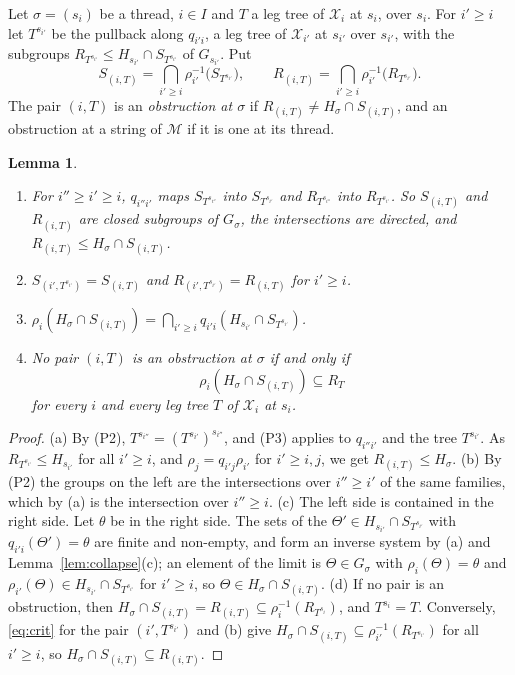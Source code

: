 \documentclass[11pt]{amsart}
\newtheorem{lem}[thm]{Lemma}
\theoremstyle{definition}
\newcommand{\cX}{\mathcal X}
\newcommand{\cM}{\mathcal M}
\begin{document}
Let $\sigma=(s_i)$ be a thread, $i\in I$ and $T$ a leg tree of $\cX_i$
at $s_i$, over $s_i$. For $i'\ge i$ let $T^{s_{i'}}$ be the pullback
along $q_{i'i}$, a leg tree of $\cX_{i'}$ at $s_{i'}$ over $s_{i'}$,
with the subgroups $R_{T^{s_{i'}}}\le H_{s_{i'}}\cap S_{T^{s_{i'}}}$
of $G_{s_{i'}}$. Put
\[
S_{(i,T)}=\bigcap_{i'\ge i}\rho_{i'}^{-1}\bigl(S_{T^{s_{i'}}}\bigr),
\qquad
R_{(i,T)}=\bigcap_{i'\ge i}\rho_{i'}^{-1}\bigl(R_{T^{s_{i'}}}\bigr).
\]
The pair $(i,T)$ is an \emph{obstruction at $\sigma$} if
$R_{(i,T)}\ne H_\sigma\cap S_{(i,T)}$, and an obstruction at a string
of $\cM$ if it is one at its thread.

\begin{lem}\label{lem:groups}
\begin{enumerate}
\item[(a)] For $i''\ge i'\ge i$, $q_{i''i'}$ maps $S_{T^{s_{i''}}}$
into $S_{T^{s_{i'}}}$ and $R_{T^{s_{i''}}}$ into $R_{T^{s_{i'}}}$. So
$S_{(i,T)}$ and $R_{(i,T)}$ are closed subgroups of $G_\sigma$,
the intersections are directed, and $R_{(i,T)}\le H_\sigma\cap
S_{(i,T)}$.
\item[(b)] $S_{(i',T^{s_{i'}})}=S_{(i,T)}$ and
$R_{(i',T^{s_{i'}})}=R_{(i,T)}$ for $i'\ge i$.
\item[(c)] $\rho_i(H_\sigma\cap S_{(i,T)})=\bigcap_{i'\ge
i}q_{i'i}(H_{s_{i'}}\cap S_{T^{s_{i'}}})$.
\item[(d)] No pair $(i,T)$ is an obstruction at $\sigma$ if and only
if
\begin{equation}\label{eq:crit}
\rho_i(H_\sigma\cap S_{(i,T)})\subseteq R_T
\end{equation}
for every $i$ and every leg tree $T$ of $\cX_i$ at $s_i$.
\end{enumerate}
\end{lem}
\begin{proof}
(a) By (P2), $T^{s_{i''}}=(T^{s_{i'}})^{s_{i''}}$, and (P3) applies to
$q_{i''i'}$ and the tree $T^{s_{i'}}$. As $R_{T^{s_{i'}}}\le
H_{s_{i'}}$ for all $i'\ge i$, and $\rho_j=q_{i'j}\rho_{i'}$ for
$i'\ge i,j$, we get $R_{(i,T)}\le H_\sigma$. (b) By (P2) the groups on
the left are the intersections over $i''\ge i'$ of the same families,
which by (a) is the intersection over $i''\ge i$. (c) The left side is
contained in the right side. Let $\theta$ be in the right side. The
sets of the $\Theta'\in H_{s_{i'}}\cap S_{T^{s_{i'}}}$ with
$q_{i'i}(\Theta')=\theta$ are finite and non-empty, and form an
inverse system by (a) and Lemma~\ref{lem:collapse}(c); an element of
the limit is $\Theta\in G_\sigma$ with $\rho_i(\Theta)=\theta$ and
$\rho_{i'}(\Theta)\in H_{s_{i'}}\cap S_{T^{s_{i'}}}$ for $i'\ge i$, so
$\Theta\in H_\sigma\cap S_{(i,T)}$. (d) If no pair is an obstruction, then
$H_\sigma\cap S_{(i,T)}=R_{(i,T)}\subseteq\rho_i^{-1}(R_{T^{s_i}})$,
and $T^{s_i}=T$. Conversely, \eqref{eq:crit} for the pair
$(i',T^{s_{i'}})$ and (b) give $H_\sigma\cap
S_{(i,T)}\subseteq\rho_{i'}^{-1}(R_{T^{s_{i'}}})$ for all $i'\ge i$,
so $H_\sigma\cap S_{(i,T)}\subseteq R_{(i,T)}$.
\end{proof}
\end{document}
